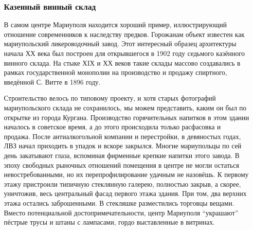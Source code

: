  
 
 
 
 

\subsubsection{Казенный винный склад}

В самом центре Мариуполя находится хороший пример, иллюстрирующий отношение
современников к наследству предков. Горожанам объект известен как мариупольский
ликероводочный завод. Этот интересный образец архитектуры начала ХХ века был
построен для открывшегося в 1902 году седьмого казённого винного склада. На
стыке ХIХ и ХХ веков такие склады массово создавались в рамках государственной
монополии на производство и продажу спиртного, введённой С. Витте в 1896 году.


Строительство велось по типовому проекту, и хотя старых фотографий
мариупольского склада не сохранилось, мы можем представить, каким он был по
открытке из города Кургана. Производство горячительных напитков в этом здании
началось в советское время, а до этого происходила только расфасовка и продажа.
После антиалкогольной компании и перестройки, в девяностых годах, ЛВЗ начал
приходить в упадок и вскоре закрылся. Многие мариупольцы по сей день закатывают
глаза, вспоминая фирменные крепкие напитки этого завода. В эпоху свободных
рыночных отношений помещения в центре не могли остаться невостребованными, но
их перепрофилирование удачным не назовёшь. К первому этажу пристроили типичную
стеклянную галерею, полностью закрыв, а скорее, уничтожив, весь центральный
фасад первого этажа здания. При том, два верхних этажа остались заброшенными. В
стекляшке разместились торговцы вещами. Вместо потенциальной
достопримечательности, центр Мариуполя \enquote{украшают} пёстрые трусы и штаны с
лампасами, гордо выставленные в витринах.

